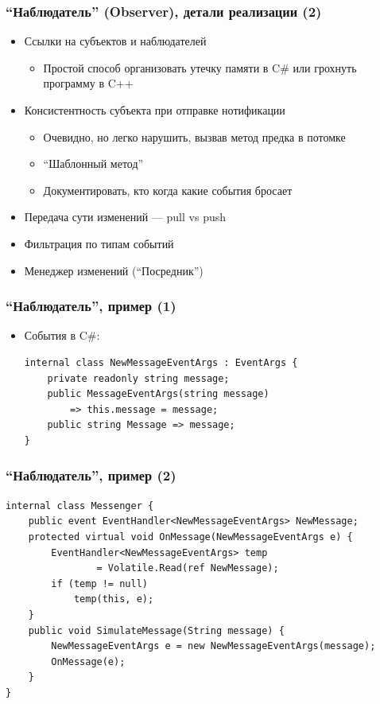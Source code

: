\documentclass[xetex,mathserif,serif]{beamer}
\begin{document}
		\begin{frame}
		\frametitle{``Наблюдатель'' (Observer), детали реализации (2)}
		\begin{itemize}
			\item Ссылки на субъектов и наблюдателей
			\begin{itemize}
				\item Простой способ организовать утечку памяти в C\# или грохнуть программу в C++
			\end{itemize}
			\item Консистентность субъекта при отправке нотификации
			\begin{itemize}
				\item Очевидно, но легко нарушить, вызвав метод предка в потомке
				\item ``Шаблонный метод''
				\item Документировать, кто когда какие события бросает
			\end{itemize}
			\item Передача сути изменений --- pull vs push
			\item Фильтрация по типам событий
			\item Менеджер изменений (``Посредник'')
		\end{itemize}
	\end{frame}

	\begin{frame}[fragile]
		\frametitle{``Наблюдатель'', пример (1)}
		\begin{itemize}
			\item События в C\#:
			\begin{verbatim}
internal class NewMessageEventArgs : EventArgs {
    private readonly string message;
    public MessageEventArgs(string message) 
        => this.message = message;
    public string Message => message;
}
			\end{verbatim}
		\end{itemize}
\end{frame}

	\begin{frame}[fragile]
		\frametitle{``Наблюдатель'', пример (2)}
		\begin{small}
			\begin{verbatim}
internal class Messenger {
    public event EventHandler<NewMessageEventArgs> NewMessage;
    protected virtual void OnMessage(NewMessageEventArgs e) {
        EventHandler<NewMessageEventArgs> temp 
                = Volatile.Read(ref NewMessage);
        if (temp != null) 
            temp(this, e);
    }
    public void SimulateMessage(String message) {
        NewMessageEventArgs e = new NewMessageEventArgs(message);
        OnMessage(e);
    }
}
			\end{verbatim}
		\end{small}
\end{frame}
\end{document}
